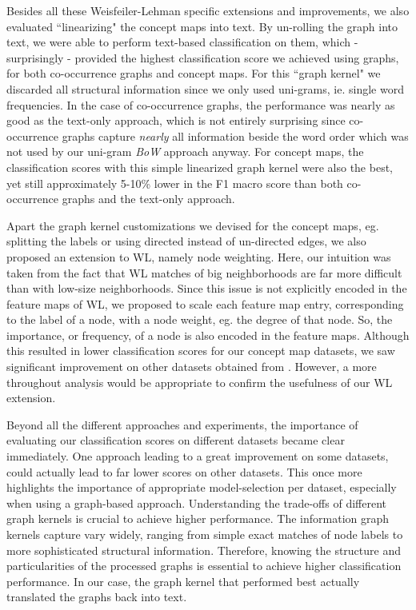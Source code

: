 Besides all these Weisfeiler-Lehman specific extensions and improvements, we also evaluated ``linearizing" the concept maps into text.
By un-rolling the graph into text, we were able to perform text-based classification on them, which - surprisingly - provided the highest classification score we achieved using graphs, for both co-occurrence graphs and concept maps.
For this ``graph kernel" we discarded all structural information since we only used uni-grams, ie. single word frequencies.
In the case of co-occurrence graphs, the performance was nearly as good as the text-only approach, which is not entirely surprising since co-occurrence graphs capture \textit{nearly} all information beside the word order which was not used by our uni-gram \textit{BoW} approach anyway.
For concept maps, the classification scores with this simple linearized graph kernel were also the best, yet still approximately 5-10\% lower in the F1 macro score than both co-occurrence graphs and the text-only approach.

Apart the graph kernel customizations we devised for the concept maps, eg. splitting the labels or using directed instead of un-directed edges, we also proposed an extension to WL, namely node weighting.
Here, our intuition was taken from the fact that WL matches of big neighborhoods are far more difficult than with low-size neighborhoods.
Since this issue is not explicitly encoded in the feature maps of WL, we proposed to scale each feature map entry, corresponding to the label of a node, with a node weight, eg. the degree of that node.
So, the importance, or frequency, of a node is also encoded in the feature maps.
Although this resulted in lower classification scores for our concept map datasets, we saw significant improvement on other datasets obtained from \cite{Kersting2016}.
However, a more throughout analysis would be appropriate to confirm the usefulness of our WL extension.

Beyond all the different approaches and experiments, the importance of evaluating our classification scores on different datasets became clear immediately.
One approach leading to a great improvement on some datasets, could actually lead to far lower scores on other datasets.
This once more highlights the importance of appropriate model-selection per dataset, especially when using a graph-based approach.
Understanding the trade-offs of different graph kernels is crucial to achieve higher performance.
The information graph kernels capture vary widely, ranging from simple exact matches of node labels to more sophisticated structural information.
Therefore, knowing the structure and particularities of the processed graphs is essential to achieve higher classification performance.
In our case, the graph kernel that performed best actually translated the graphs back into text.

